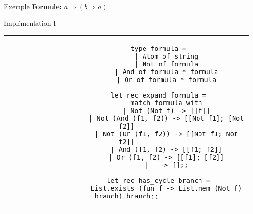 \documentclass[]{beamer}
\begin{document}
\begin{frame}{Exemple}
    \textbf{Formule:} $a \Rightarrow (b \Rightarrow a)$

    \begin{center}
    \end{center}
\end{frame}

\begin{frame}[fragile]{Implémentation 1}
    \begin{center}
        \begin{tabular}{c}
            \begin{lstlisting}
                type formula =
                    | Atom of string
                    | Not of formula
                    | And of formula * formula
                    | Or of formula * formula

                let rec expand formula =
                    match formula with
                    | Not (Not f) -> [[f]]
                    | Not (And (f1, f2)) -> [[Not f1]; [Not f2]]
                    | Not (Or (f1, f2)) -> [[Not f1; Not f2]]
                    | And (f1, f2) -> [[f1; f2]]
                    | Or (f1, f2) -> [[f1]; [f2]]
                    | _ -> [];;

                let rec has_cycle branch =
                    List.exists (fun f -> List.mem (Not f) branch) branch;;
            \end{lstlisting}
        \end{tabular}
      \end{center}
\end{frame}
\end{document}
